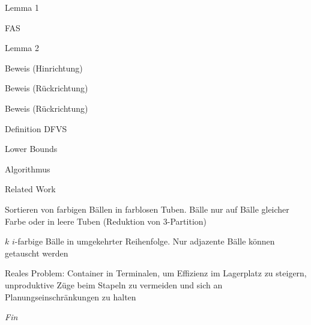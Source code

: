 \documentclass{beamer}
\begin{document}
\begin{frame}{Lemma 1}
\end{frame}

\begin{frame}{FAS}
\end{frame}

\begin{frame}{Lemma 2}
\end{frame}

\begin{frame}{Beweis (Hinrichtung)}
\end{frame}

\begin{frame}{Beweis (Rückrichtung)}
\end{frame}

\begin{frame}{Beweis (Rückrichtung)}
\end{frame}

\begin{frame}{Definition DFVS}
\end{frame}

\begin{frame}{Lower Bounds}
\end{frame}

\begin{frame}{Algorithmus}
\end{frame}

\begin{frame}{Related Work}
	\begin{pointlist}
		\item Sortieren von farbigen Bällen in farblosen Tuben. Bälle nur auf Bälle gleicher Farbe oder in leere Tuben (Reduktion von 3-Partition)
		\item $k$ $i$-farbige Bälle in umgekehrter Reihenfolge. Nur adjazente Bälle können getauscht werden 
		\item Reales Problem: Container in Terminalen, um Effizienz im Lagerplatz zu steigern, unproduktive Züge beim Stapeln zu vermeiden und sich an Planungseinschränkungen zu halten 
	\end{pointlist}
\end{frame}



\begin{frame}{}
  \centering \Huge
  \emph{Fin}
\end{frame}


	
    	
    	
    	
\end{document}
